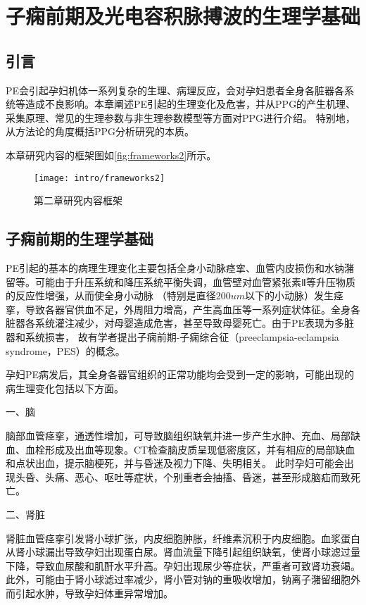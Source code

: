 \chapter{子痫前期及光电容积脉搏波的生理学基础}
\section{引言}
PE会引起孕妇机体一系列复杂的生理、病理反应，会对孕妇患者全身各脏器各系统等造成不良影响。本章阐述PE引起的生理变化及危害，并从PPG的产生机理、采集原理、常见的生理参数与非生理参数模型等方面对PPG进行介绍。
特别地，从方法论的角度概括PPG分析研究的本质。

本章研究内容的框架图如\autoref{fig:frameworks2}所示。
\begin{figure}[htbp]
    \centering
    \texttt{[image: intro/frameworks2]} 
    \caption{\label{fig:frameworks2}第二章研究内容框架}
\end{figure}

\section{子痫前期的生理学基础}
PE引起的基本的病理生理变化主要包括全身小动脉痉挛、血管内皮损伤和水钠潴留等。可能由于升压系统和降压系统平衡失调，血管壁对血管紧张素Ⅱ等升压物质的反应性增强，从而使全身小动脉
（特别是直径200$um$以下的小动脉）发生痉挛，导致各器官供血不足，外周阻力增高，产生高血压等一系列症状体征。全身各脏器各系统灌注减少，对母婴造成危害，甚至导致母婴死亡。由于PE表现为多脏器和系统损害，
故有学者提出子痫前期-子痫综合征（preeclampsia-eclampsia syndrome，PES）的概念\cite{a_hospital,OAG9}。

孕妇PE病发后，其全身各器官组织的正常功能均会受到一定的影响，可能出现的病生理变化包括以下方面。

一、脑

脑部血管痉挛，通透性增加，可导致脑组织缺氧并进一步产生水肿、充血、局部缺血、血栓形成及出血等现象。CT检查脑皮质呈现低密度区，并有相应的局部缺血和点状出血，提示脑梗死，并与昏迷及视力下降、失明相关。
此时孕妇可能会出现头昏、头痛、恶心、呕吐等症状，个别重者会抽搐、昏迷，甚至形成脑疝而致死亡。

二、肾脏

肾脏血管痉挛引发肾小球扩张，内皮细胞肿胀，纤维素沉积于内皮细胞。血浆蛋白从肾小球漏出导致孕妇出现蛋白尿。肾血流量下降引起组织缺氧，使肾小球滤过量下降，导致血尿酸和肌酐水平升高。孕妇出现尿少等症状，严重者可致肾功衰竭。
此外，可能由于肾小球滤过率减少，肾小管对钠的重吸收增加，钠离子潴留细胞外而引起水肿，导致孕妇体重异常增加。

